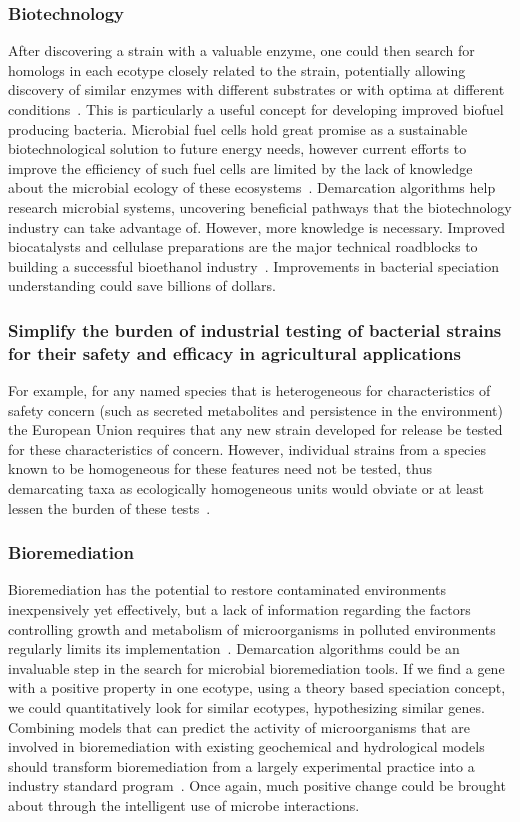 \subsubsection*{Biotechnology}
After discovering a strain with a valuable enzyme, one could then search for homologs in each ecotype closely related to the strain, potentially allowing discovery of similar enzymes with different substrates or with optima at different conditions~\cite{cohan2007systematics}.
This is particularly a useful concept for developing improved biofuel producing bacteria.
Microbial fuel cells hold great promise as a sustainable biotechnological solution to future energy needs, however current efforts to improve the efficiency of such fuel cells are limited by the lack of knowledge about the microbial ecology of these ecosystems~\cite{rabaey2004biofuel}.
Demarcation algorithms help research microbial systems, uncovering beneficial pathways that the biotechnology industry can take advantage of.
However, more knowledge is necessary.
Improved biocatalysts and cellulase preparations are the major technical roadblocks to building a successful bioethanol industry~\cite{dien2003bacteria}.
Improvements in bacterial speciation understanding could save billions of dollars.

\subsubsection*{Simplify the burden of industrial testing of bacterial strains for their safety and efficacy in agricultural applications}
For example, for any named species that is heterogeneous for characteristics of safety concern (such as secreted metabolites and persistence in the environment) the European Union requires that any new strain developed for release be tested for these characteristics of concern.
However, individual strains from a species known to be homogeneous for these features need not be tested, thus demarcating taxa as ecologically homogeneous units would obviate or at least lessen the burden of these tests~\cite{cohan2007systematics}.

\subsubsection*{Bioremediation}
Bioremediation has the potential to restore contaminated environments inexpensively yet effectively, but a lack of information regarding the factors controlling growth and metabolism of microorganisms in polluted environments regularly limits its implementation~\cite{lovley2003cleaning}.
Demarcation algorithms could be an invaluable step in the search for microbial bioremediation tools.
If we find a gene with a positive property in one ecotype, using a theory based speciation concept, we could quantitatively look for similar ecotypes, hypothesizing similar genes.
Combining models that can predict the activity of microorganisms that are involved in bioremediation with existing geochemical and hydrological models should transform bioremediation from a largely experimental practice into a industry standard program~\cite{lovley2003cleaning}.
Once again, much positive change could be brought about through the intelligent use of microbe interactions.

